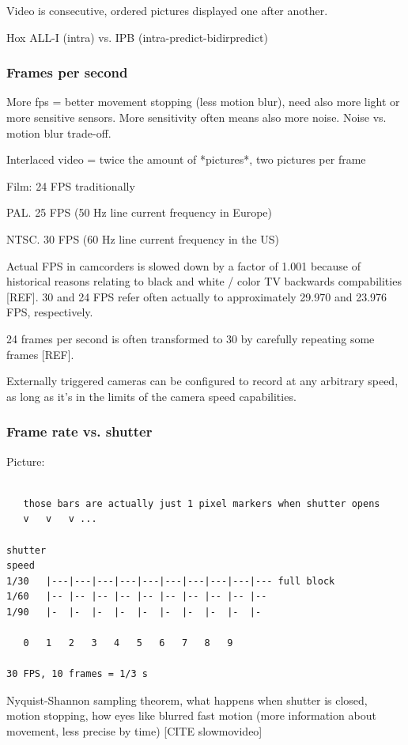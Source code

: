Video is consecutive, ordered pictures displayed one after another.

Hox ALL-I (intra) vs. IPB (intra-predict-bidirpredict)

\subsubsection{Frames per second}

More fps = better movement stopping (less motion blur), need also more light or more sensitive sensors. More sensitivity often means also more noise. Noise vs. motion blur trade-off.

Interlaced video = twice the amount of *pictures*, two pictures per frame

Film: 24 FPS traditionally

PAL. 25 FPS (50 Hz line current frequency in Europe)

NTSC. 30 FPS (60 Hz line current frequency in the US)

Actual FPS in camcorders is slowed down by a factor of 1.001 because of historical reasons relating to black and white / color TV backwards compabilities [REF].
30 and 24 FPS refer often actually to approximately 29.970 and 23.976 FPS, respectively.

24 frames per second is often transformed to 30 by carefully repeating some frames [REF].

Externally triggered cameras can be configured to record at any arbitrary speed, as long as it's in the limits of the camera speed capabilities.

\subsubsection{Frame rate vs. shutter}

Picture:

\begin{verbatim}

   those bars are actually just 1 pixel markers when shutter opens
   v   v   v ...

shutter
speed
1/30   |---|---|---|---|---|---|---|---|---|--- full block
1/60   |-- |-- |-- |-- |-- |-- |-- |-- |-- |--
1/90   |-  |-  |-  |-  |-  |-  |-  |-  |-  |-

   0   1   2   3   4   5   6   7   8   9

30 FPS, 10 frames = 1/3 s
\end{verbatim}

Nyquist-Shannon sampling theorem, what happens when shutter is closed, motion stopping, how eyes like blurred fast motion (more information about movement, less precise by time) [CITE slowmovideo]

